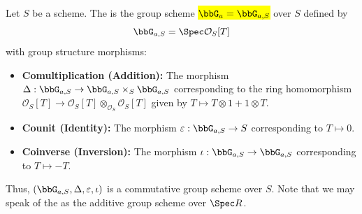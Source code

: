\begin{definition} \label{definition:additive_group_scheme_over_a_scheme}
Let $S$ be a scheme. 
The  is the group scheme \hl{$\bbG_{a} = \bbG_{a,S}$} over $S$ defined by
$$ \bbG_{a,S} = \Spec \mathcal{O}_S[T] $$
with group structure morphisms:
\begin{itemize}
  \item \textbf{Comultiplication (Addition):} The morphism $\Delta: \bbG_{a,S} \to \bbG_{a,S} \times_S \bbG_{a,S}$ corresponding to the ring homomorphism $\mathcal{O}_S[T] \to \mathcal{O}_S[T] \otimes_{\mathcal{O}_S} \mathcal{O}_S[T]$ given by $T \mapsto T \otimes 1 + 1 \otimes T$.
  \item \textbf{Counit (Identity):} The morphism $\varepsilon: \bbG_{a,S} \to S$ corresponding to $T \mapsto 0$.
  \item \textbf{Coinverse (Inversion):} The morphism $\iota: \bbG_{a,S} \to \bbG_{a,S}$ corresponding to $T \mapsto -T$.
\end{itemize}
Thus, $(\bbG_{a,S}, \Delta, \varepsilon, \iota)$ is a commutative group scheme over $S$. Note that we may speak of the  as the additive group scheme over $\Spec R$. 

\end{definition}
